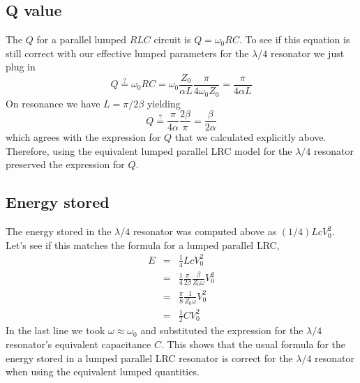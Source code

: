 \documentclass{article}
\begin{document}
\subsection{Q value}

The $Q$ for a parallel lumped $RLC$ circuit is $Q = \omega_0 RC$. To see if this equation is still correct with our effective lumped parameters for the $\lambda/4$ resonator we just plug in \begin{equation}
Q \stackrel{?}{=} \omega_0 R C = \omega_0 \frac{Z_0}{\alpha L} \frac{\pi}{4 \omega_0 Z_0} = \frac{\pi}{4 \alpha L} \end{equation}
On resonance we have $L = \pi/2\beta$ yielding \begin{equation}
Q \stackrel{?}{=} \frac{\pi}{4 \alpha}\frac{2 \beta}{\pi} = \frac{\beta}{2\alpha} \end{equation}
which agrees with the expression for $Q$ that we calculated explicitly above. Therefore, using the equivalent lumped parallel LRC model for the $\lambda/4$ resonator preserved the expression for $Q$.

\subsection{Energy stored}

The energy stored in the $\lambda/4$ resonator was computed above as $(1/4)Lc V_0^2$. Let's see if this matches the formula for a lumped parallel LRC, \begin{eqnarray*}
E &=& \frac{1}{4} Lc V_0^2 \\
&=& \frac{1}{4}\frac{\pi}{2\beta}\frac{\beta}{Z_0 \omega} V_0^2 \\
&=& \frac{\pi}{8}\frac{1}{Z_0 \omega} V_0^2 \\
&=& \frac{1}{2}C V_0^2 \end{eqnarray*}
In the last line we took $\omega \approx \omega_0$ and substituted the expression for the $\lambda/4$ resonator's equivalent capacitance $C$. This shows that the usual formula for the energy stored in a lumped parallel LRC resonator is correct for the $\lambda/4$ resonator when using the equivalent lumped quantities.
\end{document}
